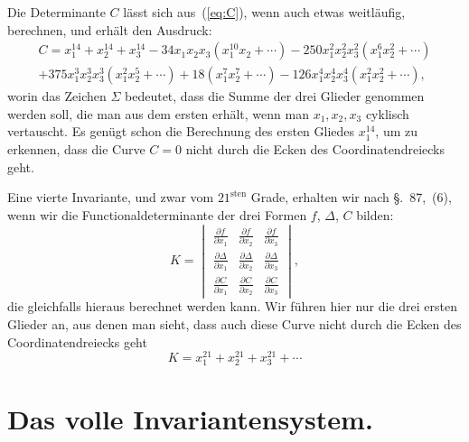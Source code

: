 \documentclass[12pt,a4paper]{article}
\begin{document}
Die Determinante $C$ l\"asst sich aus~(\ref{eq:C}), wenn auch etwas weitl\"aufig, berechnen, und erh\"alt den Ausdruck:
\begin{multline}
\label{eq:Cform} C = x_1^{14} + x_2^{14} + x_3^{14} - 34x_1 x_2 x_3 (x_1^{10} x_2 + \cdots) - 250x_1^2 x_2^2 x_3^2 (x_1^6 x_2^2 + \cdots)\\ + 375x_1^3 x_2^3 x_3^3 (x_1^2 x_2^5 + \cdots) + 18(x_1^7 x_2^7 + \cdots) - 126x_1^4 x_2^4 x_3^4 (x_1^2 x_2^2 + \cdots),
\end{multline}
worin das Zeichen $\Sigma$ bedeutet, dass die Summe der drei Glieder genommen werden soll, die man aus dem ersten erh\"alt, wenn man $x_1, x_2, x_3$ cyklisch vertauscht. Es gen\"ugt schon die Berechnung des ersten Gliedes $x_1^{14}$, um zu erkennen, dass die Curve $C = 0$ nicht durch die Ecken des Coordinatendreiecks geht.

Eine vierte Invariante, und zwar vom $21^{\text{sten}}$ Grade, erhalten wir nach \S.~87,~(6), wenn wir die Functionaldeterminante der drei Formen $f$, $\Delta$, $C$ bilden:
\begin{equation}
\label{eq:K} K = \begin{vmatrix} \tfrac{\partial f}{\partial x_1} & \tfrac{\partial f}{\partial x_2} & \tfrac{\partial f}{\partial x_3} \\[0.5em] \tfrac{\partial \Delta}{\partial x_1} & \tfrac{\partial \Delta}{\partial x_2} & \tfrac{\partial \Delta}{\partial x_3} \\[0.5em] \tfrac{\partial C}{\partial x_1} & \tfrac{\partial C}{\partial x_2} & \tfrac{\partial C}{\partial x_3} \end{vmatrix},
\end{equation}
die gleichfalls hieraus berechnet werden kann. Wir f\"uhren hier nur die drei ersten Glieder an, aus denen man sieht, dass auch diese Curve nicht durch die Ecken des Coordinatendreiecks geht
\begin{equation}
\label{eq:Kform} K = x_1^{21} + x_2^{21} + x_3^{21} + \cdots
\end{equation}


\newpage
\section{Das volle Invariantensystem.}
\label{sec:124}
\end{document}
